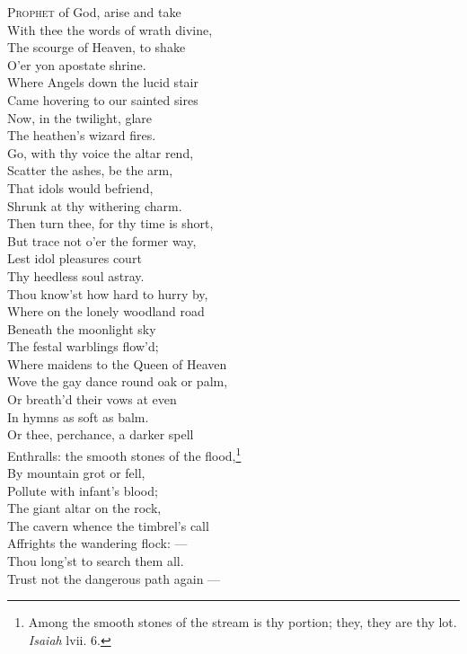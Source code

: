 \textsc{Prophet} of God, arise and take \\
 With thee the words of wrath divine, \\
 The scourge of Heaven, to shake \\
 O’er yon apostate shrine. \\
  Where Angels down the lucid stair \\
 Came hovering to our sainted sires \\
 Now, in the twilight, glare \\
 The heathen’s wizard fires. \\
  Go, with thy voice the altar rend, \\
 Scatter the ashes, be the arm, \\
 That idols would befriend, \\
 Shrunk at thy withering charm. \\
  Then turn thee, for thy time is short, \\
 But trace not o’er the former way, \\
 Lest idol pleasures court \\
 Thy heedless soul astray. \\
  Thou know’st how hard to hurry by, \\
 Where on the lonely woodland road \\
 Beneath the moonlight sky \\
 The festal warblings flow’d; \\
  Where maidens to the Queen of Heaven \\
 Wove the gay dance round oak or palm, \\
 Or breath’d their vows at even \\
 In hymns as soft as balm. \\
  Or thee, perchance, a darker spell \\
 Enthralls: the smooth stones of the flood,\footnote{Among the smooth stones of the stream is thy portion; they, they are thy lot. \emph{Isaiah} lvii. 6.} \\
 By mountain grot or fell, \\
 Pollute with infant’s blood; \\
  The giant altar on the rock, \\
 The cavern whence the timbrel’s call \\
 Affrights the wandering flock: — \\
 Thou long’st to search them all. \\
  Trust not the dangerous path again — \\
